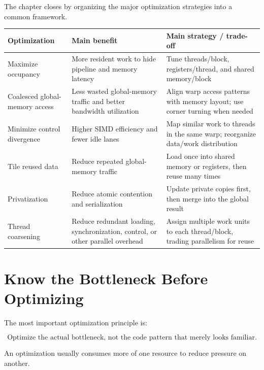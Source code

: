 \documentclass[11pt]{article}
\begin{document}
The chapter closes by organizing the major optimization strategies into a common framework.

\begin{center}
\begin{tabular}{>{\raggedright\arraybackslash}p{}
                >{\raggedright\arraybackslash}p{}
                >{\raggedright\arraybackslash}p{}}
\toprule
Optimization & Main benefit & Main strategy / trade-off \\
\midrule
Maximize occupancy &
More resident work to hide pipeline and memory latency &
Tune threads/block, registers/thread, and shared memory/block \\

Coalesced global-memory access &
Less wasted global-memory traffic and better bandwidth utilization &
Align warp access patterns with memory layout; use corner turning when needed \\

Minimize control divergence &
Higher SIMD efficiency and fewer idle lanes &
Map similar work to threads in the same warp; reorganize data/work distribution \\

Tile reused data &
Reduce repeated global-memory traffic &
Load once into shared memory or registers, then reuse many times \\

Privatization &
Reduce atomic contention and serialization &
Update private copies first, then merge into the global result \\

Thread coarsening &
Reduce redundant loading, synchronization, control, or other parallel overhead &
Assign multiple work units to each thread/block, trading parallelism for reuse \\
\bottomrule
\end{tabular}
\end{center}

\section{Know the Bottleneck Before Optimizing}

The most important optimization principle is:

\[
\boxed{
\text{Optimize the actual bottleneck, not the code pattern that merely looks familiar.}
}
\]

An optimization usually consumes more of one resource to reduce pressure on another.
\end{document}
